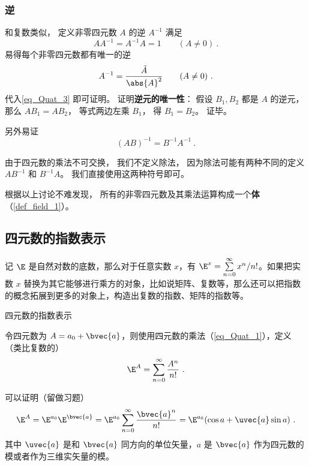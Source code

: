 \subsubsection{逆}
和复数类似， 定义非零四元数 $A$ 的逆 $A^{-1}$ 满足
\begin{equation}\label{eq_Quat_3}
AA^{-1} = A^{-1}A = 1 \qquad (A \ne 0)~.
\end{equation}
易得每个非零四元数都有唯一的逆
\begin{equation}\label{eq_Quat_4}
A^{-1} = \frac{\tilde A}{\abs{A}^2} \qquad (A \ne 0)~.
\end{equation}
代入\autoref{eq_Quat_3} 即可证明。 证明\textbf{逆元的唯一性}： 假设 $B_1, B_2$ 都是 $A$ 的逆元， 那么 $AB_1 = AB_2$， 等式两边左乘 $B_1$， 得 $B_1 = B_2$。 证毕。

另外易证
\begin{equation}
(AB)^{-1} = B^{-1}A^{-1}~.
\end{equation}

由于四元数的乘法不可交换， 我们不定义除法， 因为除法可能有两种不同的定义 $AB^{-1}$ 和 $B^{-1}A$。 我们直接使用这两种符号即可。

根据以上讨论不难发现， 所有的非零四元数及其乘法运算构成一个\textbf{体}（\autoref{def_field_1}）。





\subsection{四元数的指数表示}

记 $\E$ 是自然对数的底数，那么对于任意实数 $x$，有 $\E^x = \sum^\infty\limits_{n=0} x^n / n!$。如果把实数 $x$ 替换为其它能够进行乘方的对象，比如说矩阵、复数等，那么还可以把指数的概念拓展到更多的对象上，构造出复数的指数、矩阵的指数等。

\begin{definition}{四元数的指数表示}

令四元数为 $A=a_0+\bvec{a}$，则使用四元数的乘法（\autoref{eq_Quat_1}），定义（类比复数的）
\begin{equation}\label{eq_Quat_2}
\E^A = \sum^\infty\limits_{n=0}\frac{A^n}{n!}~. 
\end{equation}
\end{definition}
可以证明（留做习题）
\begin{equation}
\E^A = \E^{a_0}\E^{\bvec{a}}=\E^{a_0}\sum^\infty\limits_{n=0}\frac{\bvec{a}^n}{n!}=\E^{a_0}(\cos{a}+ \uvec{a}\sin a)~.
\end{equation}
其中 $\uvec{a}$ 是和 $\bvec{a}$ 同方向的单位矢量，$a$ 是 $\bvec{a}$ 作为四元数的模或者作为三维实矢量的模。

